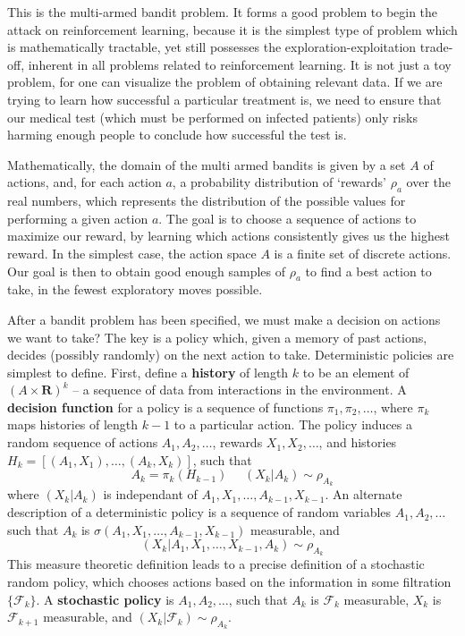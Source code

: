 This is the multi-armed bandit problem. It forms a good problem to begin the attack on reinforcement learning, because it is the simplest type of problem which is mathematically tractable, yet still possesses the exploration-exploitation trade-off, inherent in all problems related to reinforcement learning. It is not just a toy problem, for one can visualize the problem of obtaining relevant data. If we are trying to learn how successful a particular treatment is, we need to ensure that our medical test (which must be performed on infected patients) only risks harming enough people to conclude how successful the test is.

Mathematically, the domain of the multi armed bandits is given by a set $A$ of actions, and, for each action $a$, a probability distribution of `rewards' $\rho_a$ over the real numbers, which represents the distribution of the possible values for performing a given action $a$. The goal is to choose a sequence of actions to maximize our reward, by learning which actions consistently gives us the highest reward. In the simplest case, the action space $A$ is a finite set of discrete actions. Our goal is then to obtain good enough samples of $\rho_a$ to find a best action to take, in the fewest exploratory moves possible.

After a bandit problem has been specified, we must make a decision on actions we want to take? The key is a policy which, given a memory of past actions, decides (possibly randomly) on the next action to take. Deterministic policies are simplest to define. First, define a {\bf history} of length $k$ to be an element of $(A \times \mathbf{R})^k$ -- a sequence of data from interactions in the environment. A {\bf decision function} for a policy is a sequence of functions $\pi_1, \pi_2, \dots$, where $\pi_k$ maps histories of length $k-1$ to a particular action. The policy induces a random sequence of actions $A_1, A_2, \dots$, rewards $X_1, X_2, \dots$, and histories $H_k = [(A_1,X_1), \dots, (A_k,X_k)]$, such that
%
\[ A_k = \pi_k(H_{k-1})\ \ \ \ \ \ (X_k | A_k) \sim \rho_{A_k} \]
%
where $(X_k | A_k)$ is independant of $A_1, X_1, \dots, A_{k-1}, X_{k-1}$. An alternate description of a deterministic policy is a sequence of random variables $A_1, A_2, \dots$ such that $A_k$ is $\sigma(A_1,X_1,\dots,A_{k-1},X_{k-1})$ measurable, and
%
\[ (X_k | A_1, X_1, \dots, X_{k-1}, A_k) \sim \rho_{A_k} \]
%
This measure theoretic definition leads to a precise definition of a stochastic random policy, which chooses actions based on the information in some filtration $\{ \mathcal{F}_k \}$. A {\bf stochastic policy} is $A_1, A_2, \dots$, such that $A_k$ is $\mathcal{F}_k$ measurable, $X_k$ is $\mathcal{F}_{k+1}$ measurable, and $(X_k | \mathcal{F}_k) \sim \rho_{A_k}$.

